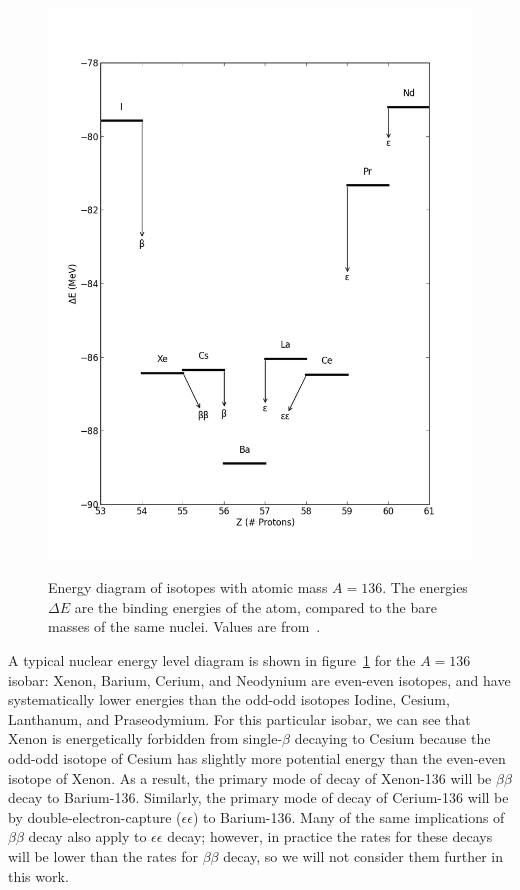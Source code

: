 \begin{figure}
\begin{center}
\includegraphics[keepaspectratio=true,width=\textwidth]{scripts/LevelDiagram.png}
\end{center}
\renewcommand{\baselinestretch}{1}
\small\normalsize
\begin{quote}
\caption{Energy diagram of isotopes with atomic mass $A=136$.  The energies $\Delta E$ are the binding energies of the atom, compared to the bare masses of the same nuclei.  Values are from~\cite{AtomicMassEvaluation}.}
\label{fig:LevelDiagram}
\end{quote}
\end{figure}
\renewcommand{\baselinestretch}{2}
\small\normalsize

A typical nuclear energy level diagram is shown in figure~\ref{fig:LevelDiagram} for the $A=136$ isobar: Xenon, Barium, Cerium, and Neodynium are even-even isotopes, and have systematically lower energies than the odd-odd isotopes Iodine, Cesium, Lanthanum, and Praseodymium.  For this particular isobar, we can see that Xenon is energetically forbidden from single-$\beta$ decaying to Cesium because the odd-odd isotope of Cesium has slightly more potential energy than the even-even isotope of Xenon. As a result, the primary mode of decay of Xenon-136 will be $\beta\beta$ decay to Barium-136.  Similarly, the primary mode of decay of Cerium-136 will be by double-electron-capture ($\epsilon\epsilon$) to Barium-136.  Many of the same implications of $\beta\beta$ decay also apply to $\epsilon\epsilon$ decay; however, in practice the rates for these decays will be lower than the rates for $\beta\beta$ decay, so we will not consider them further in this work.

